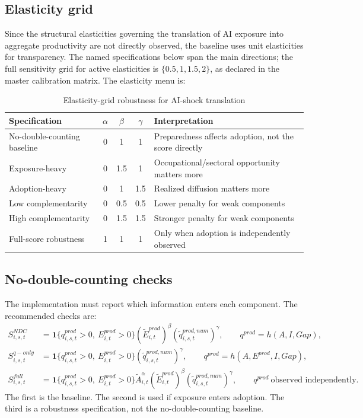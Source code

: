 \documentclass[11pt,a4paper]{article}
\begin{document}
\subsection{Elasticity grid}

Since the structural elasticities governing the translation of AI exposure into aggregate productivity are not directly observed, the baseline uses unit elasticities for transparency. The named specifications below span the main directions; the full sensitivity grid for active elasticities is $\{0.5,1,1.5,2\}$, as declared in the master calibration matrix. The elasticity menu is:
\begin{table}[H]
\centering
\caption{Elasticity-grid robustness for AI-shock translation}
\label{tab:elasticity_grid}
\small
\begin{tabular}{lccc p{}}
\toprule
Specification & $\alpha$ & $\beta$ & $\gamma$ & Interpretation \\
\midrule
No-double-counting baseline & 0 & 1 & 1 & Preparedness affects adoption, not the score directly \\
Exposure-heavy & 0 & 1.5 & 1 & Occupational/sectoral opportunity matters more \\
Adoption-heavy & 0 & 1 & 1.5 & Realized diffusion matters more \\
Low complementarity & 0 & 0.5 & 0.5 & Lower penalty for weak components \\
High complementarity & 0 & 1.5 & 1.5 & Stronger penalty for weak components \\
Full-score robustness & 1 & 1 & 1 & Only when adoption is independently observed \\
\bottomrule
\end{tabular}
\end{table}

\subsection{No-double-counting checks}

The implementation must report which information enters each component. The recommended checks are:
\begin{align}
    S^{NDC}_{i,s,t}&=\mathbf{1}\{q^{prod}_{i,s,t}>0,\ E^{prod}_{i,t}>0\}(\tilde E^{prod}_{i,t})^{\beta}(\tilde q^{prod,num}_{i,s,t})^{\gamma},\qquad q^{prod}=h(A,I,Gap),\\
    S^{q-only}_{i,s,t}&=\mathbf{1}\{q^{prod}_{i,s,t}>0,\ E^{prod}_{i,t}>0\}(\tilde q^{prod,num}_{i,s,t})^{\gamma},\qquad q^{prod}=h(A,E^{prod},I,Gap),\\
    S^{full}_{i,s,t}&=\mathbf{1}\{q^{prod}_{i,s,t}>0,\ E^{prod}_{i,t}>0\}\tilde A_{i,t}^{\alpha}(\tilde E^{prod}_{i,t})^{\beta}(\tilde q^{prod,num}_{i,s,t})^{\gamma},\qquad q^{prod}\ \text{observed independently.}
\end{align}
The first is the baseline. The second is used if exposure enters adoption. The third is a robustness specification, not the no-double-counting baseline.
\end{document}
